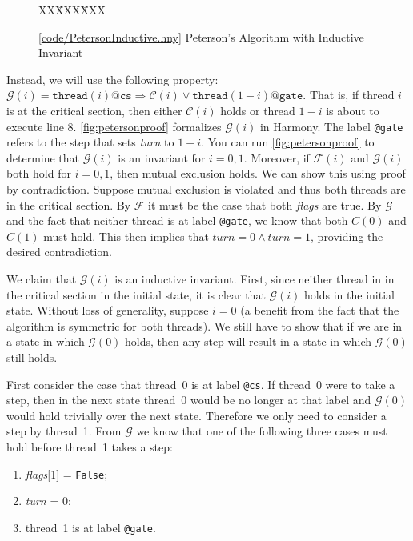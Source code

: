 \documentclass{report}
\newcommand{\harmonysource}[1]{
\begin{tabbing}
XX\=XXX\=XXX\kill
    
\end{tabbing}
}
\newcommand{\harmonylink}[1]{%
[\href{https://harmony.cs.cornell.edu/#1}{\underline{#1}}]%
}
\newenvironment{code}{
\tcolorbox
}{
\endtcolorbox
}
\begin{document}
\begin{figure}
\begin{code}
\harmonysource{PetersonInductive}
\end{code}
\caption{\harmonylink{code/PetersonInductive.hny} Peterson's Algorithm with Inductive Invariant}
\label{fig:petersonproof}
\end{figure}

Instead, we will use the following property: $\mathcal{G}(i) =
\mathtt{thread}(i)@\mathtt{cs} \Rightarrow \mathcal{C}(i) \lor \mathtt{thread}(1-i)@\mathtt{gate}$.
That is, if thread $i$ is at the critical section, then
either $\mathcal{C}(i)$ holds or thread $1-i$ is about to execute line 8.
\autoref{fig:petersonproof} formalizes $\mathcal{G}(i)$ in Harmony.
The label \texttt{@gate} refers to the step that sets \textit{turn} to $1-i$.
You can run \autoref{fig:petersonproof} to determine
that $\mathcal{G}(i)$ is an invariant for $i = 0, 1$.
Moreover, if $\mathcal{F}(i)$ and $\mathcal{G}(i)$ both hold for $i = 0, 1$,
then mutual exclusion holds.  We can show this using proof by
contradiction.  Suppose mutual exclusion is violated and thus both threads are in
the critical section.  By $\mathcal{F}$ it must be the case that both
\textit{flags} are true.  By $\mathcal{G}$ and the fact that neither thread
is at label \texttt{@gate}, we know that both $C(0)$ and $C(1)$ must hold.
This then implies that $\mathit{turn} = 0 \land \mathit{turn} = 1$, providing
the desired contradiction.

We claim that $\mathcal{G}(i)$ is an inductive invariant.
First, since neither thread in in the critical section in the initial state,
it is clear that $\mathcal{G}(i)$ holds in the initial state.
Without loss of generality, suppose $i=0$ (a benefit from the fact that the algorithm is
symmetric for both threads).  We still have to show that if we are in a state
in which $\mathcal{G}(0)$ holds, then any step will result in a
state in which $\mathcal{G}(0)$ still holds.

First consider the case that thread~0 is at label \texttt{@cs}.  If thread~0
were to take a step, then in the next state thread~0 would be no longer
at that label and $\mathcal{G}(0)$ would hold trivially over the next state.
Therefore we only need to consider a step by thread~1.
%
From $\mathcal{G}$ we know that one of the following three cases must hold before
thread~1 takes a step:
\begin{enumerate}
\item \textit{flags}[1] = \texttt{False};
\item \textit{turn} = 0;
\item thread~1 is at label \texttt{@gate}.
\end{enumerate}
\end{document}
